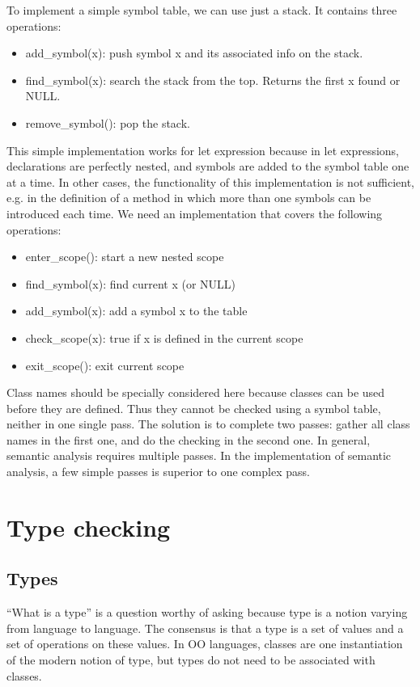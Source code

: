 To implement a simple symbol table, we can use just a stack. It contains three operations:
\begin{itemize}
\item add\_symbol(x): push symbol x and its associated info on the stack. 
\item find\_symbol(x): search the stack from the top. Returns the first x found or NULL.
\item remove\_symbol(): pop the stack.
\end{itemize}
This simple implementation works for {\sf let} expression because in {\sf let} expressions, declarations are perfectly nested, and symbols are added to the symbol table one at a time. In other cases, the functionality of this implementation is not sufficient, e.g. in the definition of a method in which more than one symbols can be introduced each time. We need an implementation that covers the following operations:
\begin{itemize}
\item enter\_scope(): start a new nested scope
\item find\_symbol(x): find current x (or NULL)
\item add\_symbol(x): add a symbol x to the table
\item check\_scope(x): true if x is defined in the current scope
\item exit\_scope(): exit current scope
\end{itemize}

Class names should be specially considered here because classes can be used before they are defined. Thus they cannot be checked using a symbol table, neither in one single pass. The solution is to complete two passes: gather all class names in the first one, and do the checking in the second one. In general, semantic analysis requires multiple passes. In the implementation of semantic analysis, a few simple passes is superior to one complex pass.
\section{Type checking}
\subsection{Types}
``What is a type'' is a question worthy of asking because type is a notion varying from language to language. The consensus is that a type is a set of values and a set of operations on these values. In OO languages, classes are one instantiation of the modern notion of type, but types do not need to be associated with classes. 

